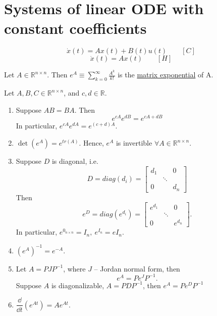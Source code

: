 \documentclass[twoside]{article}
\newcommand\lb{\left (}
\newcommand\rb{\right )}
\begin{document}
\section{Systems of linear ODE with constant coefficients}
\begin{equation}
    \dot{x}(t) = A x(t) + B(t)u(t) \qquad [C]
\end{equation}
\begin{equation}
    \dot{x}(t) = A x(t) \qquad [H]
\end{equation}
\begin{definition}
    Let $A \in \mathbb{R}^{n\times n}$. Then $e^{A} \equiv \sum_{k=0}^{\infty} \frac{A^{k}}{k!}$ is the \underline{matrix exponential} of A.
\end{definition}
\begin{theorem}
    Let $A, B, C \in \mathbb{R}^{n\times n}$, and $c, d \in \mathbb{R}$.
    \begin{enumerate}
        \item Suppose $AB = BA$. Then \[
        e^{cA}e^{dB} = e^{cA+dB}
        \]
        In particular, $e^{cA}e^{dA} = e^{(c+d)A}$.
        \item $\det(e^{A}) = e^{tr{(A)}}$. Hence, $e^{A}$ is invertible $\forall A \in \mathbb{R}^{n \times n}$.
        \item Suppose $D$ is diagonal, i.e. \[
        D = diag(d_{i}) = \begin{bmatrix}
            d_{1} & & 0\\
            &\ddots& \\
            0 & & d_{n}
        \end{bmatrix}
        \]
        Then \[
        e^{D} = diag(e^{d_{i}}) = \begin{bmatrix}
            e^{d_{1}} & & 0\\
            &\ddots& \\
            0 & & e^{d_{n}}
        \end{bmatrix}.
        \]
        In particular, $e^{0_{n \times n}} = I_{n}, ~e^{I_{n}} = e I_{n}$.
        \item $(e^{A})^{-1} = e^{-A}$.
        \item Let $A = P J P^{-1}$, where $J$ -- Jordan normal form, then \[
        e^{A} = P e^{J} P^{-1}.
        \]
        Suppose $A$ is diagonalizable, $A = P D P^{-1}$, then $e^{A} = P e^{D} P^{-1}$
        \item  $
        \dfrac{\dd }{\dd t} \lb e^{At} \rb = A e^{At}.
        $
    \end{enumerate}
\end{theorem}
\end{document}
